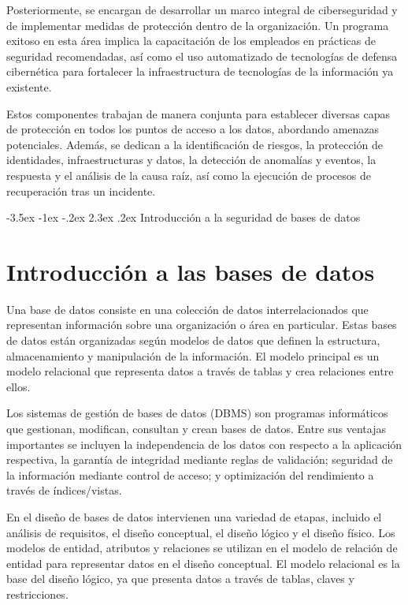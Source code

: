 \documentclass[11pt]{report}
\makeatletter
\renewcommand\chapter{\@startsection{chapter}{0}{\z@}%
    {-3.5ex \@plus -1ex \@minus -.2ex}%
    {2.3ex \@plus.2ex}%
    {\normalfont\Large\bfseries}}
\makeatother
\begin{document}
Posteriormente, se encargan de desarrollar un marco integral de ciberseguridad y de implementar medidas de protección dentro de la organización. Un programa exitoso en esta área implica la capacitación de los empleados en prácticas de seguridad recomendadas, así como el uso automatizado de tecnologías de defensa cibernética para fortalecer la infraestructura de tecnologías de la información ya existente.

Estos componentes trabajan de manera conjunta para establecer diversas capas de protección en todos los puntos de acceso a los datos, abordando amenazas potenciales. Además, se dedican a la identificación de riesgos, la protección de identidades, infraestructuras y datos, la detección de anomalías y eventos, la respuesta y el análisis de la causa raíz, así como la ejecución de procesos de recuperación tras un incidente.

\cleardoublepage

\chapter{Introducción a la seguridad de bases de datos}
\section{Introducción a las bases de datos}
Una base de datos consiste en una colección de datos interrelacionados que representan
información sobre una organización o área en particular. Estas bases de datos están
organizadas según modelos de datos que definen la estructura, almacenamiento y
manipulación de la información. El modelo principal es un modelo relacional que representa
datos a través de tablas y crea relaciones entre ellos.

Los sistemas de gestión de bases de datos (DBMS) son programas informáticos que
gestionan, modifican, consultan y crean bases de datos. Entre sus ventajas importantes se
incluyen la independencia de los datos con respecto a la aplicación respectiva, la garantía
de integridad mediante reglas de validación; seguridad de la información mediante control
de acceso; y optimización del rendimiento a través de índices/vistas.

En el diseño de bases de datos intervienen una variedad de etapas, incluido el análisis de
requisitos, el diseño conceptual, el diseño lógico y el diseño físico. Los modelos de entidad,
atributos y relaciones se utilizan en el modelo de relación de entidad para representar datos
en el diseño conceptual. El modelo relacional es la base del diseño lógico, ya que presenta
datos a través de tablas, claves y restricciones.
\end{document}
